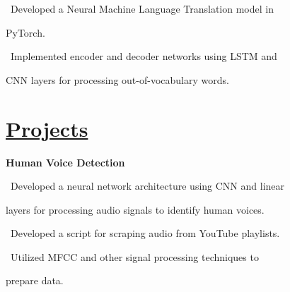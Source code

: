 \documentclass{article}
\begin{document}
\begin{minipage}[t]{0.45\textwidth\hspace{0in}}
\begin{minipage}[t]{3.75in\textwidth\hspace{0in}}
            \small\mdseries
            \vspace{0.21em}
            \hspace{1em}\textasteriskcentered \, \mdseries\textrm{Developed a Neural Machine Language Translation model in} 
            
            \hspace{1.7em} PyTorch.
            
            \vspace{0.2em}
            \hspace{1em}\textasteriskcentered \, \mdseries\textrm{Implemented encoder and decoder networks using LSTM and}
            
            \hspace{1.7em} CNN layers for processing out-of-vocabulary words.
        \end{minipage}

        \section{\underline{Projects}}
        \begin{minipage}[t]{3.75in\textwidth\hspace{0in}}
            \mdseries\bfseries{Human Voice Detection}            
            
            \vspace{0.6em}
            \small\mdseries
            \hspace{1em}\textasteriskcentered \, \mdseries\textrm{Developed a neural network architecture using CNN and linear} 
            
            \hspace{2em}layers for processing audio signals to identify human voices.

            \vspace{0.6em}
            \hspace{1em}\textasteriskcentered \, \mdseries\textrm{Developed a script for scraping audio from YouTube playlists.}
            
            \vspace{0.6em}
            \hspace{1em}\textasteriskcentered \, \mdseries\textrm{Utilized MFCC and other signal processing techniques to} 
            
            \hspace{1.7em} prepare data.

        \end{minipage}

\end{minipage}
\end{document}
